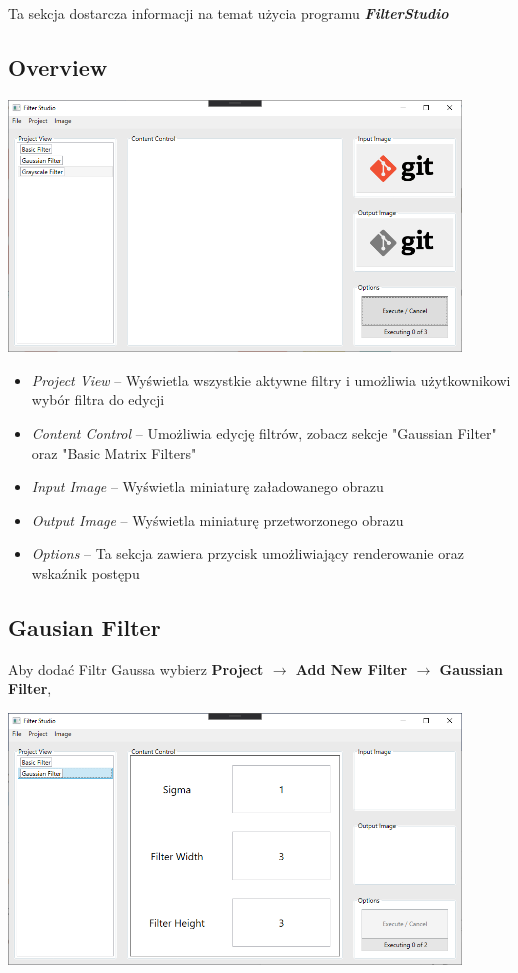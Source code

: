 \documentclass{article}
\begin{document}
Ta sekcja dostarcza informacji na temat użycia programu \textbf{\textit{FilterStudio}}
\subsection{Overview}

\bigskip
\includegraphics[width=0.9\textwidth]{overview.png}

\begin{itemize}
    \item \textit{Project View} -- Wyświetla wszystkie aktywne filtry i umożliwia użytkownikowi wybór filtra do edycji
    \item \textit{Content Control} -- Umożliwia edycję filtrów, zobacz sekcje "Gaussian Filter" oraz "Basic Matrix Filters"
    \item \textit{Input Image} -- Wyświetla miniaturę załadowanego obrazu
    \item \textit{Output Image} -- Wyświetla miniaturę przetworzonego obrazu
    \item \textit{Options} -- Ta sekcja zawiera przycisk umożliwiający renderowanie oraz wskaźnik postępu
\end{itemize}

\newpage
\subsection{Gausian Filter}
Aby dodać Filtr Gaussa wybierz \textbf{Project $\rightarrow$ Add New Filter $\rightarrow$ Gaussian Filter},

\bigskip
\includegraphics[width=0.9\textwidth]{gauss.png}
\bigskip
\end{document}
